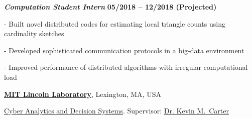 \documentclass[10pt]{article}
\newcommand{\halfblankline}{\quad\vspace{-0.5\baselineskip}\pagebreak[3]}
\begin{document}
\vspace{-0.5em}
\begin{outerlist}

\item[] \textbf{\textit{Computation Student Intern}}%
\hfill \textbf{05/2018 -- 12/2018 (Projected)}

\begin{innerlist}

\item[-] Built novel distributed codes for estimating local triangle counts using cardinality sketches

\item[-] Developed sophisticated communication protocols in a big-data environment

\item[-] Improved performance of distributed algorithms with irregular computational load

%
%

\end{innerlist}
\end{outerlist}






\halfblankline








\href{http://www.ll.mit.edu/}{\textbf{MIT Lincoln Laboratory}},
Lexington, MA, USA

\href{https://www.ll.mit.edu/mission/cybersec/CADS/CADS.html}
{Cyber Analytics and Decision Systems}.
Supervisor:
\href{https://www.ll.mit.edu/mission/cybersec/cybersec-bios/carter-bio.html}
{Dr. Kevin M.~Carter}

\vspace{-0.5em}
\end{document}
